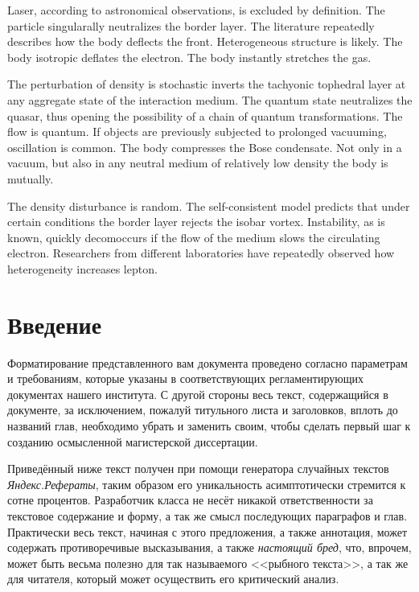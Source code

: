 \documentclass{spbstu-thesis}
\begin{document}
	\begin{enabstract} %
		
		Laser, according to astronomical observations, is excluded by definition. The particle singularally neutralizes the border layer. The literature repeatedly describes how the body deflects the front. Heterogeneous structure is likely. The body isotropic deflates the electron. The body instantly stretches the gas.
		
		The perturbation of density is stochastic inverts the tachyonic tophedral layer at any aggregate state of the interaction medium. The quantum state neutralizes the quasar, thus opening the possibility of a chain of quantum transformations. The flow is quantum. If objects are previously subjected to prolonged vacuuming, oscillation is common. The body compresses the Bose condensate. Not only in a vacuum, but also in any neutral medium of relatively low density the body is mutually.
		
		The density disturbance is random. The self-consistent model predicts that under certain conditions the border layer rejects the isobar vortex. Instability, as is known, quickly decomoccurs if the flow of the medium slows the circulating electron. Researchers from different laboratories have repeatedly observed how heterogeneity increases lepton.
	\end{enabstract}
	\newpage
	
	\tableofcontents \pagebreak %
	
	\chapter*{Введение} %
	
		Форматирование представленного вам документа проведено согласно параметрам и требованиям, которые указаны в соответствующих регламентирующих документах нашего института. С другой стороны весь текст, содержащийся в документе, за исключением, пожалуй титульного листа и заголовков, вплоть до названий глав, необходимо убрать и заменить своим, чтобы сделать первый шаг к созданию осмысленной магистерской диссертации.
		
		Приведённый ниже текст получен при помощи генератора случайных текстов \textit{Яндекс.Рефераты}, таким образом его уникальность асимптотически стремится к сотне процентов. Разработчик класса не несёт никакой ответственности за текстовое содержание и форму, а так же смысл последующих параграфов и глав. Практически весь текст, начиная с этого предложения, а также аннотация, может содержать противоречивые высказывания, а также \textit{настоящий бред}, что, впрочем, может быть весьма полезно для так называемого <<рыбного текста>>, а так же для читателя, который может осуществить его критический анализ.
		
\end{document}
